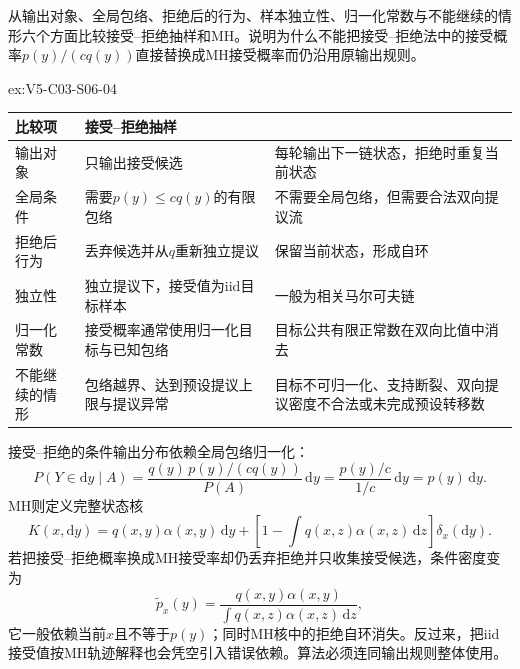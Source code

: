 \begin{SLChapterExercisePairSection}
\begin{exercise}\label{ex:V5-C03-S06-04}
从输出对象、全局包络、拒绝后的行为、样本独立性、归一化常数与不能继续的情形六个方面比较接受--拒绝抽样和MH。说明为什么不能把接受--拒绝法中的接受概率$p(y)/(cq(y))$直接替换成MH接受概率而仍沿用原输出规则。
\end{exercise}
\ifSLFullEdition
{}\label{sol:V5-C03-S06-04}
\begin{chapterexercisesolution}{ex:V5-C03-S06-04}
\begin{center}
\small
\begin{tabularx}{\linewidth}{@{}l X X@{}}
\toprule 比较项 & 接受--拒绝抽样 & \MetropolisHastings{}\\ \midrule
输出对象 & 只输出接受候选 & 每轮输出下一链状态，拒绝时重复当前状态\\
全局条件 & 需要$p(y)\le c q(y)$的有限包络 & 不需要全局包络，但需要合法双向提议流\\
拒绝后行为 & 丢弃候选并从$q$重新独立提议 & 保留当前状态，形成自环\\
独立性 & 独立提议下，接受值为iid目标样本 & 一般为相关马尔可夫链\\
归一化常数 & 接受概率通常使用归一化目标与已知包络 & 目标公共有限正常数在双向比值中消去\\
不能继续的情形 & 包络越界、达到预设提议上限与提议异常 & 目标不可归一化、支持断裂、双向提议密度不合法或未完成预设转移数\\
\bottomrule
\end{tabularx}
\end{center}
接受--拒绝的条件输出分布依赖全局包络归一化：
\[
P(Y\in\mathrm dy\mid A)
=\frac{q(y)\,p(y)/(cq(y))}{P(A)}\,\mathrm dy
=\frac{p(y)/c}{1/c}\,\mathrm dy=p(y)\,\mathrm dy.
\]
MH则定义完整状态核
\[
K(x,\mathrm dy)=q(x,y)\alpha(x,y)\,\mathrm dy
+\left[1-\int q(x,z)\alpha(x,z)\,\mathrm dz\right]\delta_x(\mathrm dy).
\]
若把接受--拒绝概率换成MH接受率却仍丢弃拒绝并只收集接受候选，条件密度变为
\[
\widetilde p_x(y)
=\frac{q(x,y)\alpha(x,y)}
{\int q(x,z)\alpha(x,z)\,\mathrm dz},
\]
它一般依赖当前$x$且不等于$p(y)$；同时MH核中的拒绝自环消失。反过来，把iid接受值按MH轨迹解释也会凭空引入错误依赖。算法必须连同输出规则整体使用。
\end{chapterexercisesolution}
\fi


\end{SLChapterExercisePairSection}

